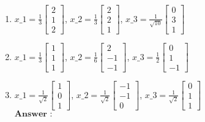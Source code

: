 \documentclass[11pt]{article}
\begin{document}
\begin{enumerate}
\def\labelenumi{\Alph{enumi}.}
\setcounter{enumi}{1}
\item
  $ x\_1 = \frac{1}{3}
  \begin{bmatrix} 2 \\ 1 \\ 2 \end{bmatrix}
  $, $ x\_2 = \frac{1}{3}
  \begin{bmatrix} 2 \\ 2 \\ 1 \end{bmatrix}
  $, $ x\_3 = \frac{1}{\sqrt{10}}
  \begin{bmatrix} 0 \\ 3 \\ 1 \end{bmatrix}
  $\\
\item
  $ x\_1 = \frac{1}{3}
  \begin{bmatrix} 1 \\ 1 \\ 1 \end{bmatrix}
  $, $ x\_2 = \frac{1}{6}
  \begin{bmatrix} 2 \\ -1 \\ -1 \end{bmatrix}
  $, $ x\_3 = \frac{1}{2}
  \begin{bmatrix} 0 \\ 1 \\ -1 \end{bmatrix}
  $\\
\item
  $ x\_1 = \frac{1}{\sqrt{2}}
  \begin{bmatrix} 1 \\ 0 \\ 1 \end{bmatrix}
  $, $ x\_2 = \frac{1}{\sqrt{2}}
  \begin{bmatrix} -1 \\ -1 \\ 0 \end{bmatrix}
  $, $ x\_3 = \frac{1}{\sqrt{2}}
  \begin{bmatrix} 0 \\ 1 \\ 1 \end{bmatrix}
  $\\
  $\textbf{Answer :}$
\end{enumerate}
\end{document}
